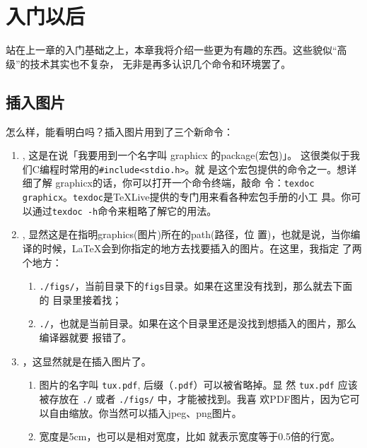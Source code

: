 \chapter{入门以后}

站在上一章的入门基础之上，本章我将介绍一些更为有趣的东西。这些貌似“高级”的技术其实也不复杂，
无非是再多认识几个命令和环境罢了。

\section{插入图片}

\begin{codeblock}[.9]
\end{codeblock}

怎么样，能看明白吗？插入图片用到了三个新命令：

\begin{enumerate}
\item \ltx{\usepackage{graphicx}}, 这是在说「我要用到一个名字叫 graphicx 的package(宏包)」。
  这很类似于我们C编程时常用的\texttt{\#include<stdio.h>}。\ltx{\texttt{[image: ]}}就
  是这个宏包提供的命令之一。想详细了解 graphicx的话，你可以打开一个命令终端，敲命
  令：\texttt{texdoc graphicx}。\texttt{texdoc}是TeXLive提供的专门用来看各种宏包手册的小工
  具。你可以通过\texttt{texdoc -h}命令来粗略了解它的用法。
\item {}, 显然这是在指明graphics(图片)所在的path(路径，位
  置)，也就是说，当你编译的时候，\LaTeX{}会到你指定的地方去找要插入的图片。在这里，我指定
  了两个地方：
  \begin{enumerate}
  \item \texttt{./figs/}，当前目录下的\texttt{figs}目录。如果在这里没有找到，那么就去下面的
    目录里接着找；
  \item \texttt{./}，也就是当前目录。如果在这个目录里还是没找到想插入的图片，那么编译器就要
    报错了。
  \end{enumerate}
\item {}，这显然就是在插入图片了。
  \begin{enumerate}
  \item 图片的名字叫 \texttt{tux.pdf}, 后缀（\texttt{.pdf}）可以被省略掉。显
    然 \texttt{tux.pdf} 应该被存放在 \texttt{./} 或者 \texttt{./figs/} 中，才能被找到。我喜
    欢PDF图片，因为它可以自由缩放。你当然可以插入jpeg、png图片。
  \item 宽度是5cm，也可以是相对宽度，比如 \ltx{[width=.5\linewidth]} 就表示宽度等于0.5倍的行宽。
  \end{enumerate}
\end{enumerate}

